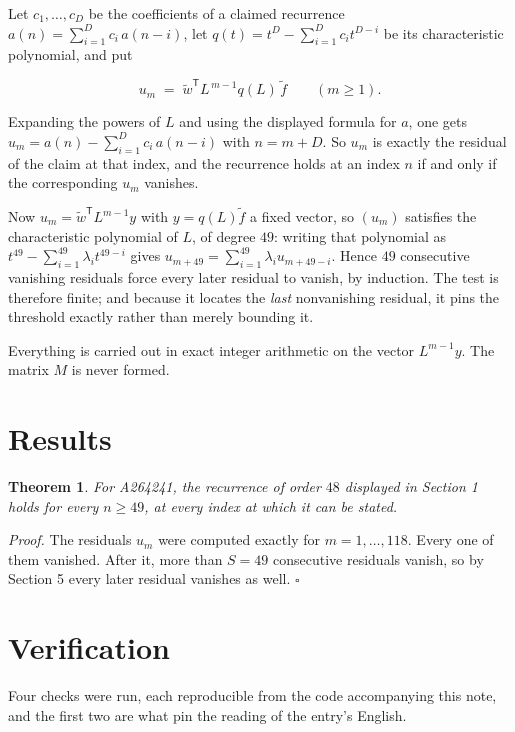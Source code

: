 \documentclass[11pt]{article}
\newtheorem{theorem}{Theorem}
\theoremstyle{definition}
\begin{document}
Let $c_1,\dots,c_D$ be the coefficients of a claimed recurrence $a(n) = \sum_{i=1}^{D} c_i\,a(n-i)$, let $q(t) = t^{D} - \sum_{i=1}^{D} c_i t^{D-i}$ be its characteristic polynomial, and put

\[u_m \;=\; \tilde w^{\mathsf T} L^{\,m-1} q(L)\,\tilde f \qquad (m \ge 1).\]

Expanding the powers of $L$ and using the displayed formula for $a$, one gets $u_m = a(n) - \sum_{i=1}^{D} c_i\,a(n-i)$ with $n = m + D$. So $u_m$ is exactly the residual of the claim at that index, and the recurrence holds at an index $n$ if and only if the corresponding $u_m$ vanishes.

Now $u_m = \tilde w^{\mathsf T} L^{m-1} y$ with $y = q(L)\tilde f$ a fixed vector, so $(u_m)$ satisfies the characteristic polynomial of $L$, of degree $49$: writing that polynomial as $t^{49} - \sum_{i=1}^{49} \lambda_i t^{49-i}$ gives $u_{m+49} = \sum_{i=1}^{49} \lambda_i u_{m+49-i}$. Hence $49$ consecutive vanishing residuals force every later residual to vanish, by induction. The test is therefore finite; and because it locates the {\itshape last} nonvanishing residual, it pins the threshold exactly rather than merely bounding it.

Everything is carried out in exact integer arithmetic on the vector $L^{m-1}y$. The matrix $M$ is never formed.

\section{Results}

\begin{theorem} For A264241, the recurrence of order $48$ displayed in Section 1 holds for every $n \ge 49$, at every index at which it can be stated.\end{theorem}

{\itshape Proof.} The residuals $u_m$ were computed exactly for $m = 1,\dots,118$. Every one of them vanished. After it, more than $S = 49$ consecutive residuals vanish, so by Section 5 every later residual vanishes as well. $\square$

\section{Verification}

Four checks were run, each reproducible from the code accompanying this note, and the first two are what pin the reading of the entry's English.
\end{document}
